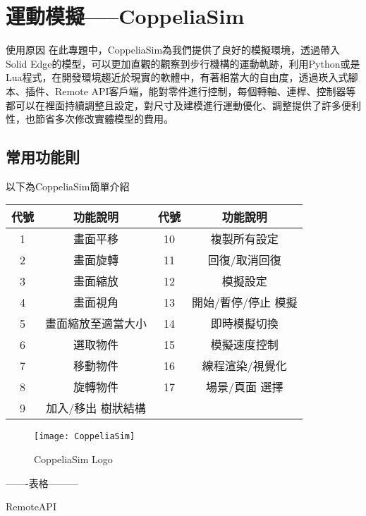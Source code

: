 \section{運動模擬-----CoppeliaSim}
\qquad 使用原因
在此專題中，CoppeliaSim為我們提供了良好的模擬環境，透過帶入Solid Edge的模型，可以更加直觀的觀察到步行機構的運動軌跡，利用Python或是Lua程式，在開發環境趨近於現實的軟體中，有著相當大的自由度，透過崁入式腳本、插件、Remote API客戶端，能對零件進行控制，每個轉軸、連桿、控制器等都可以在裡面持續調整且設定，對尺寸及建模進行運動優化、調整提供了許多便利性，也節省多次修改實體模型的費用。\\

\subsection{常用功能則}
以下為CoppeliaSim簡單介紹

\begin{table}[htbp]
  \centering
  \large
  \setlength{\tabcolsep}{0.75cm}
  \begin{tabular}{|c|c|c|c|}
    \hline
    代號 & 功能說明 & 代號 & 功能說明 \\
    \hline
    1 & 畫面平移 & 10 & 複製所有設定 \\
    \hline
    2 & 畫面旋轉 & 11 & 回復/取消回復 \\
    \hline
    3 & 畫面縮放 & 12 & 模擬設定 \\
    \hline
    4 & 畫面視角 & 13 & 開始/暫停/停止 模擬 \\
    \hline
    5 & 畫面縮放至適當大小 & 14 & 即時模擬切換 \\
    \hline
    6 & 選取物件 & 15 & 模擬速度控制 \\
    \hline
    7 & 移動物件 & 16 & 線程渲染/視覺化 \\
    \hline
    8 & 旋轉物件 & 17 & 場景/頁面 選擇 \\
    \hline
    9 & 加入/移出 樹狀結構 & & \\
    \hline
  \end{tabular}
\end{table}
\newpage

\begin{figure}[hbt!]
\center
\texttt{[image: CoppeliaSim]}
\caption{\Large CoppeliaSim Logo}
\end{figure}
-------表格---------

\qquad RemoteAPI\\

